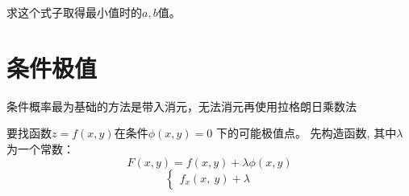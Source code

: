 \documentclass[10pt, a4paper]{article}
\begin{document}
                求这个式子取得最小值时的$a, b$值。
    \section{条件极值}
        条件概率最为基础的方法是带入消元，无法消元再使用拉格朗日乘数法

        要找函数$z = f(x, y)$在条件$\phi (x, y) = 0$ 下的可能极值点。 
        先构造函数, 其中$\lambda$为一个常数：
        $$F(x, y) = f(x, y) + \lambda \phi (x, y)$$
        \begin{equation*}
            \left\{
                \begin{aligned}
                    f_x(x,\ y) + \lambda
                \end{aligned} 
                \right.
        \end{equation*} 
\end{document}
